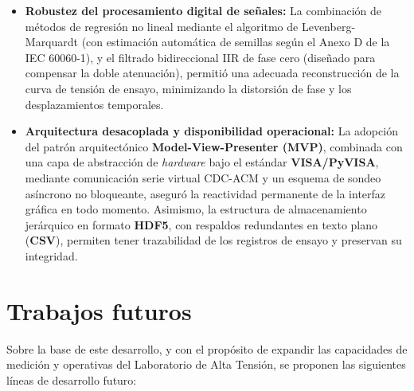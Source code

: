 \begin{itemize}
    \item \textbf{Robustez del procesamiento digital de señales:} La combinación de métodos de regresión no lineal mediante el algoritmo de Levenberg-Marquardt (con estimación automática de semillas según el Anexo D de la IEC 60060-1), y el filtrado bidireccional IIR de fase cero (diseñado para compensar la doble atenuación), permitió una adecuada reconstrucción de la curva de tensión de ensayo, minimizando la distorsión de fase y los desplazamientos temporales.

    \item \textbf{Arquitectura desacoplada y disponibilidad operacional:} La adopción del patrón arquitectónico \textbf{Model-View-Presenter (MVP)}, combinada con una capa de abstracción de \emph{hardware} bajo el estándar \textbf{VISA/PyVISA}, mediante comunicación serie virtual CDC-ACM y un esquema de sondeo asíncrono no bloqueante, aseguró la reactividad permanente de la interfaz gráfica en todo momento. Asimismo, la estructura de almacenamiento jerárquico en formato \textbf{HDF5}, con respaldos redundantes en texto plano (\textbf{CSV}), permiten tener trazabilidad de los registros de ensayo y preservan su integridad.
\end{itemize}

\section*{Trabajos futuros}
\label{sec:trabajos_futuros}
\vspace{3\baselineskip}

Sobre la base de este desarrollo, y con el propósito de expandir las capacidades de medición y operativas del Laboratorio de Alta Tensión, se proponen las siguientes líneas de desarrollo futuro:

